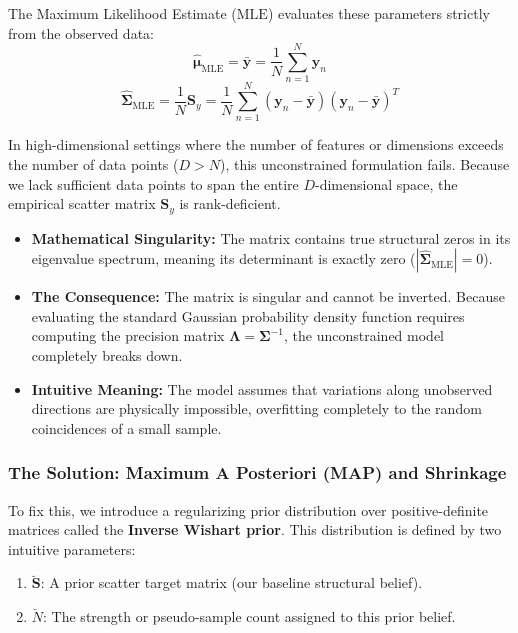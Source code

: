 \documentclass{article}
\begin{document}
The Maximum Likelihood Estimate ($\text{MLE}$) evaluates these parameters strictly from the observed data:
\begin{equation}
\hat{\boldsymbol{\mu}}_{\text{MLE}} = \bar{\mathbf{y}} = \frac{1}{N}\sum_{n=1}^N \mathbf{y}_n
\end{equation}
\begin{equation}
\hat{\boldsymbol{\Sigma}}_{\text{MLE}} = \frac{1}{N} \mathbf{S}_y = \frac{1}{N} \sum_{n=1}^N (\mathbf{y}_n - \bar{\mathbf{y}})(\mathbf{y}_n - \bar{\mathbf{y}})^T
\end{equation}

In high-dimensional settings where the number of features or dimensions exceeds the number of data points ($D > N$), this unconstrained formulation fails. Because we lack sufficient data points to span the entire $D$-dimensional space, the empirical scatter matrix $\mathbf{S}_y$ is rank-deficient. 

\begin{itemize}
    \item \textbf{Mathematical Singularity:} The matrix contains true structural zeros in its eigenvalue spectrum, meaning its determinant is exactly zero ($|\hat{\boldsymbol{\Sigma}}_{\text{MLE}}| = 0$).
    \item \textbf{The Consequence:} The matrix is singular and cannot be inverted. Because evaluating the standard Gaussian probability density function requires computing the precision matrix $\boldsymbol{\Lambda} = \boldsymbol{\Sigma}^{-1}$, the unconstrained model completely breaks down.
    \item \textbf{Intuitive Meaning:} The model assumes that variations along unobserved directions are physically impossible, overfitting completely to the random coincidences of a small sample.
\end{itemize}

\subsubsection{The Solution: Maximum A Posteriori (MAP) and Shrinkage}
To fix this, we introduce a regularizing prior distribution over positive-definite matrices called the \textbf{Inverse Wishart prior}. This distribution is defined by two intuitive parameters:
\begin{enumerate}
    \item $\breve{\mathbf{S}}$: A prior scatter target matrix (our baseline structural belief).
    \item $\breve{N}$: The strength or pseudo-sample count assigned to this prior belief.
\end{enumerate}
\end{document}
